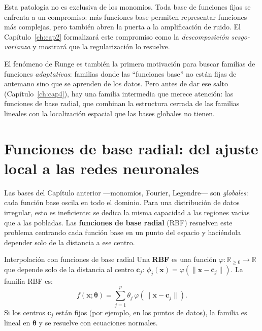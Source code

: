 Esta patología no es exclusiva de los monomios. Toda base de
funciones fijas se enfrenta a un compromiso: más funciones base
permiten representar funciones más complejas, pero también abren la
puerta a la amplificación de ruido. El Capítulo~\ref{ch:cap2}
formalizará este compromiso como la \emph{descomposición
sesgo-varianza} y mostrará que la regularización lo resuelve.

El fenómeno de Runge es también la primera motivación para buscar
familias de funciones \emph{adaptativas}: familias donde las
``funciones base'' no están fijas de antemano sino que se aprenden
de los datos. Pero antes de dar ese salto (Capítulo~\ref{ch:cap4}),
hay una familia intermedia que merece atención: las funciones de base
radial, que combinan la estructura cerrada de las familias lineales
con la localización espacial que las bases globales no tienen.

\section{Funciones de base radial: del ajuste local a las redes neuronales}
\label{sec:rbf}


Las bases del Capítulo anterior —monomios, Fourier, Legendre— son
\emph{globales}: cada función base oscila en todo el dominio. Para una
distribución de datos irregular, esto es ineficiente: se dedica la misma
capacidad a las regiones vacías que a las pobladas. Las \textbf{funciones
de base radial} (RBF) resuelven este problema centrando cada función base
en un punto del espacio y haciéndola depender solo de la distancia a ese
centro.

\begin{definicion}{Interpolación con funciones de base radial}
\label{def:rbf}
Una \textbf{RBF} es una función $\varphi: \mathbb{R}_{\geq 0} \to
\mathbb{R}$ que depende solo de la distancia al centro $\bm{c}_j$:
$\phi_j(\bm{x}) = \varphi(\|\bm{x}-\bm{c}_j\|)$. La familia RBF es:
\begin{equation}
  f(\bm{x};\bm{\theta}) = \sum_{j=1}^p \theta_j\,
  \varphi(\|\bm{x}-\bm{c}_j\|).
  \label{eq:rbf_familia}
\end{equation}
Si los centros $\bm{c}_j$ están fijos (por ejemplo, en los puntos de
datos), la familia es lineal en $\bm{\theta}$ y se resuelve con
ecuaciones normales.
\end{definicion}

